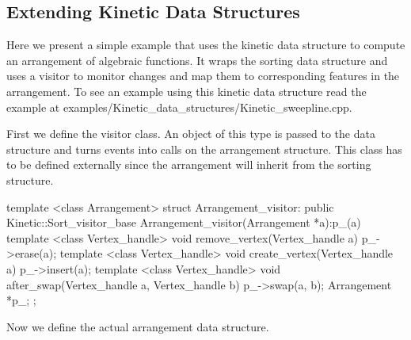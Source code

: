 

\subsection{Extending Kinetic Data Structures\label{sec:kds_sweepline_example}}


Here we present a simple example that uses the
 kinetic data structure to compute
an arrangement of algebraic functions. It wraps the sorting data
structure and uses a visitor to monitor changes and map them to
corresponding features in the arrangement. To see an example using
this kinetic data structure read the example at
examples/Kinetic\_data\_structures/Kinetic\_sweepline.cpp.

First we define the visitor class. An object of this type is passed to
the  data structure and turns
events into calls on the arrangement structure. This class has to be
defined externally since the arrangement will inherit from the sorting
structure.

\begin{ccExampleCode}
template <class Arrangement>
struct Arrangement_visitor: public Kinetic::Sort_visitor_base
{
  Arrangement_visitor(Arrangement *a):p_(a){}
  template <class Vertex_handle>
  void remove_vertex(Vertex_handle a) {
    p_->erase(a);
  }
  template <class Vertex_handle>
  void create_vertex(Vertex_handle a) {
    p_->insert(a);
  }
  template <class Vertex_handle>
  void after_swap(Vertex_handle a, Vertex_handle b) {
    p_->swap(a, b);
  }
  Arrangement *p_;
};

\end{ccExampleCode}

Now we define the actual arrangement data structure. 

